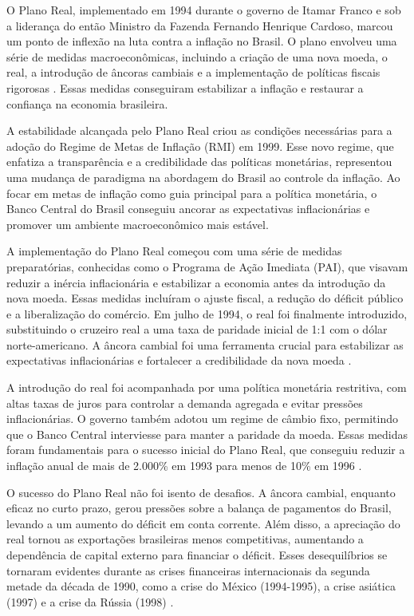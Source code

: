 \documentclass[12pt,oneside,a4paper,chapter=TITLE,english,brazil,sumario=abnt-6027-2012]{abntex2}
\begin{document}
O Plano Real, implementado em 1994 durante o governo de Itamar Franco e sob a liderança do então Ministro da Fazenda Fernando Henrique Cardoso, marcou um ponto de inflexão na luta contra a inflação no Brasil. O plano envolveu uma série de medidas macroeconômicas, incluindo a criação de uma nova moeda, o real, a introdução de âncoras cambiais e a implementação de políticas fiscais rigorosas \cite{amaurypatrickgremaud_2009_economia}. Essas medidas conseguiram estabilizar a inflação e restaurar a confiança na economia brasileira.

A estabilidade alcançada pelo Plano Real criou as condições necessárias para a adoção do Regime de Metas de Inflação (RMI) em 1999. Esse novo regime, que enfatiza a transparência e a credibilidade das políticas monetárias, representou uma mudança de paradigma na abordagem do Brasil ao controle da inflação. Ao focar em metas de inflação como guia principal para a política monetária, o Banco Central do Brasil conseguiu ancorar as expectativas inflacionárias e promover um ambiente macroeconômico mais estável.

A implementação do Plano Real começou com uma série de medidas preparatórias, conhecidas como o Programa de Ação Imediata (PAI), que visavam reduzir a inércia inflacionária e estabilizar a economia antes da introdução da nova moeda. Essas medidas incluíram o ajuste fiscal, a redução do déficit público e a liberalização do comércio. Em julho de 1994, o real foi finalmente introduzido, substituindo o cruzeiro real a uma taxa de paridade inicial de 1:1 com o dólar norte-americano. A âncora cambial foi uma ferramenta crucial para estabilizar as expectativas inflacionárias e fortalecer a credibilidade da nova moeda \cite{silva_2002_plano}. 

A introdução do real foi acompanhada por uma política monetária restritiva, com altas taxas de juros para controlar a demanda agregada e evitar pressões inflacionárias. O governo também adotou um regime de câmbio fixo, permitindo que o Banco Central interviesse para manter a paridade da moeda. Essas medidas foram fundamentais para o sucesso inicial do Plano Real, que conseguiu reduzir a inflação anual de mais de 2.000\% em 1993 para menos de 10\% em 1996 \cite{fabiogiambiagi_1999_a}.

O sucesso do Plano Real não foi isento de desafios. A âncora cambial, enquanto eficaz no curto prazo, gerou pressões sobre a balança de pagamentos do Brasil, levando a um aumento do déficit em conta corrente. Além disso, a apreciação do real tornou as exportações brasileiras menos competitivas, aumentando a dependência de capital externo para financiar o déficit. Esses desequilíbrios se tornaram evidentes durante as crises financeiras internacionais da segunda metade da década de 1990, como a crise do México (1994-1995), a crise asiática (1997) e a crise da Rússia (1998) \cite{santna_2002_crises}.
\end{document}
